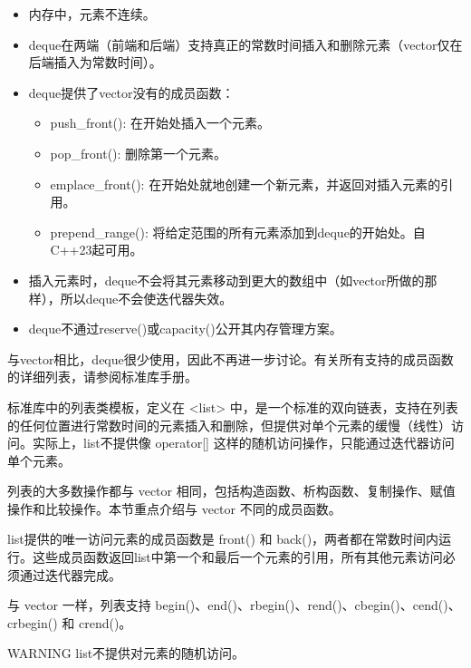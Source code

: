 \begin{itemize}
\item
内存中，元素不连续。

\item
deque在两端（前端和后端）支持真正的常数时间插入和删除元素（vector仅在后端插入为常数时间）。

\item
deque提供了vector没有的成员函数：
\begin{itemize}
\item
push\_front(): 在开始处插入一个元素。

\item
pop\_front(): 删除第一个元素。

\item
emplace\_front(): 在开始处就地创建一个新元素，并返回对插入元素的引用。

\item
prepend\_range(): 将给定范围的所有元素添加到deque的开始处。自C++23起可用。
\end{itemize}

\item
插入元素时，deque不会将其元素移动到更大的数组中（如vector所做的那样），所以deque不会使迭代器失效。

\item
deque不通过reserve()或capacity()公开其内存管理方案。
\end{itemize}

与vector相比，deque很少使用，因此不再进一步讨论。有关所有支持的成员函数的详细列表，请参阅标准库手册。


标准库中的列表类模板，定义在 <list> 中，是一个标准的双向链表，支持在列表的任何位置进行常数时间的元素插入和删除，但提供对单个元素的缓慢（线性）访问。实际上，list不提供像 operator[] 这样的随机访问操作，只能通过迭代器访问单个元素。

列表的大多数操作都与 vector 相同，包括构造函数、析构函数、复制操作、赋值操作和比较操作。本节重点介绍与 vector 不同的成员函数。


list提供的唯一访问元素的成员函数是 front() 和 back()，两者都在常数时间内运行。这些成员函数返回list中第一个和最后一个元素的引用，所有其他元素访问必须通过迭代器完成。

与 vector 一样，列表支持 begin()、end()、rbegin()、rend()、cbegin()、cend()、crbegin() 和 crend()。

\begin{myWarning}{WARNING}
list不提供对元素的随机访问。
\end{myWarning}

